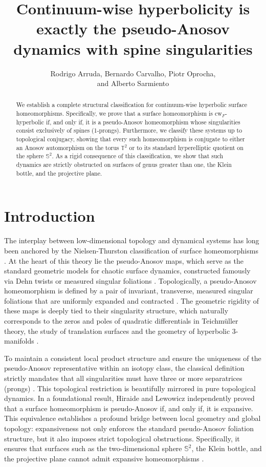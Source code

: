 \documentclass{amsart}
\title[Continuum-wise hyperbolicity and pseudo-Anosov dynamics]{Continuum-wise hyperbolicity is exactly the pseudo-Anosov dynamics with spine singularities}
\author[R. Arruda, B. Carvalho, P. Oprocha,\\
and A. Sarmiento]{Rodrigo Arruda, Bernardo Carvalho, Piotr Oprocha,\\
and Alberto Sarmiento}
\theoremstyle{plain}
\theoremstyle{definition}
\begin{document}
\begin{abstract}
We establish a complete structural classification for continuum-wise hyperbolic surface homeomorphisms. Specifically, we prove that a surface homeomorphism is cw$_F$-hyperbolic if, and only if, it is a pseudo-Anosov homeomorphism  whose singularities consist exclusively of spines (1-prongs). Furthermore, we classify these systems up to topological conjugacy, showing that every such homeomorphism is conjugate to either an Anosov automorphism on the torus $\mathbb{T}^2$ or to its standard hyperelliptic quotient on the sphere $\mathbb{S}^2$. As a rigid consequence of this classification, we show that such dynamics are strictly obstructed on surfaces of genus greater than one, the Klein bottle, and the projective plane.
\end{abstract}

\maketitle




\section{Introduction}

The interplay between low-dimensional topology and dynamical systems has long been anchored by the Nielsen-Thurston classification of surface homeomorphisms \cite{BC, FLPKM, T}. At the heart of this theory lie the pseudo-Anosov maps, which serve as the standard geometric models for chaotic surface dynamics, constructed famously via Dehn twists \cite{P} or measured singular foliations \cite{FLP, HeHi}.
Topologically, a pseudo-Anosov homeomorphism is defined by a pair of invariant, transverse, measured singular foliations that are uniformly expanded and contracted \cite{FLP}. The geometric rigidity of these maps is deeply tied to their singularity structure, which naturally corresponds to the zeros and poles of quadratic differentials in Teichmüller theory, the study of translation surfaces \cite{BL,La, MasurSmillie1993} and the geometry of hyperbolic 3-manifolds \cite{FLM}.

To maintain a consistent local product structure and ensure the uniqueness of the pseudo-Anosov representative within an isotopy class, the classical definition strictly mandates that all singularities must have three or more separatrices (prongs) \cite{FLM, FLPKM}. This topological restriction is beautifully mirrored in pure topological dynamics. In a foundational result, Hiraide \cite{Hi2} and Lewowicz \cite{L} independently proved that a surface homeomorphism is pseudo-Anosov if, and only if, it is expansive. This equivalence establishes a profound bridge between local geometry and global topology: expansiveness not only enforces the standard pseudo-Anosov foliation structure, but it also imposes strict topological obstructions. Specifically, it ensures that surfaces such as the two-dimensional sphere $\mathbb{S}^2$, the Klein bottle, and the projective plane cannot admit expansive homeomorphisms \cite{Hi2, L}.
\end{document}
